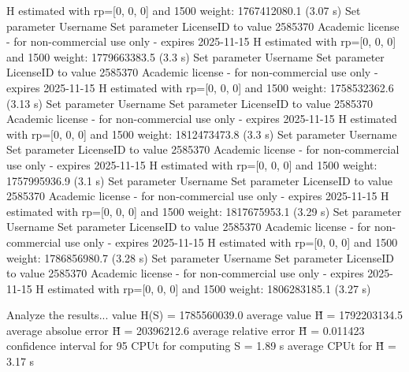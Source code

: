   H estimated with rp=[0, 0, 0] and 1500 weight:  1767412080.1  (3.07 s)
Set parameter Username
Set parameter LicenseID to value 2585370
Academic license - for non-commercial use only - expires 2025-11-15
  H estimated with rp=[0, 0, 0] and 1500 weight:  1779663383.5  (3.3 s)
Set parameter Username
Set parameter LicenseID to value 2585370
Academic license - for non-commercial use only - expires 2025-11-15
  H estimated with rp=[0, 0, 0] and 1500 weight:  1758532362.6  (3.13 s)
Set parameter Username
Set parameter LicenseID to value 2585370
Academic license - for non-commercial use only - expires 2025-11-15
  H estimated with rp=[0, 0, 0] and 1500 weight:  1812473473.8  (3.3 s)
Set parameter Username
Set parameter LicenseID to value 2585370
Academic license - for non-commercial use only - expires 2025-11-15
  H estimated with rp=[0, 0, 0] and 1500 weight:  1757995936.9  (3.1 s)
Set parameter Username
Set parameter LicenseID to value 2585370
Academic license - for non-commercial use only - expires 2025-11-15
  H estimated with rp=[0, 0, 0] and 1500 weight:  1817675953.1  (3.29 s)
Set parameter Username
Set parameter LicenseID to value 2585370
Academic license - for non-commercial use only - expires 2025-11-15
  H estimated with rp=[0, 0, 0] and 1500 weight:  1786856980.7  (3.28 s)
Set parameter Username
Set parameter LicenseID to value 2585370
Academic license - for non-commercial use only - expires 2025-11-15
  H estimated with rp=[0, 0, 0] and 1500 weight:  1806283185.1  (3.27 s)

Analyze the results...
  value H(S)                  = 1785560039.0 
  average value H̃             = 1792203134.5 
  average absolue error H̃     = 20396212.6 
  average relative error H̃    = 0.011423 
  confidence interval for 95%
  CPUt for computing S         = 1.89 s
  average CPUt for H̃           = 3.17 s

